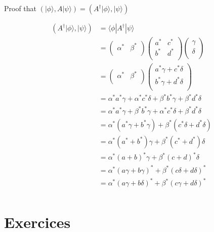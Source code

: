 \documentclass{article}
\begin{document}
Proof that $(|\phi\rangle, A|\psi\rangle) = (A^\dag|\phi\rangle, |\psi\rangle)$

\begin{equation}
    \begin{split}
        (A^\dag|\phi\rangle, |\psi\rangle) & = \langle\phi|A^\dag|\psi\rangle \\
        & = \begin{pmatrix}
            \alpha^* & \beta^* \\
        \end{pmatrix} \begin{pmatrix}
            a^* & c^* \\
            b^* & d^* \\
        \end{pmatrix} \begin{pmatrix}
            \gamma \\
            \delta \\
        \end{pmatrix} \\
        & = \begin{pmatrix}
            \alpha^* & \beta^* \\
        \end{pmatrix} \begin{pmatrix}
            a^*\gamma + c^*\delta \\
            b^*\gamma + d^*\delta \\
        \end{pmatrix} \\
        & = \alpha^*a^*\gamma + \alpha^*c^*\delta + \beta^*b^*\gamma + \beta^*d^*\delta \\
        & = \alpha^*a^*\gamma + \beta^*b^*\gamma + \alpha^*c^*\delta + \beta^*d^*\delta \\
        & = \alpha^*(a^*\gamma + b^*\gamma) + \beta^*(c^*\delta + d^*\delta) \\
        & = \alpha^*(a^* + b^*)\gamma + \beta^*(c^* + d^*)\delta \\
        & = \alpha^*(a + b)^*\gamma + \beta^*(c + d)^*\delta \\
        & = \alpha^*(a\gamma + b\gamma)^* + \beta^*(c\delta + d\delta)^* \\
        & = \alpha^*(a\gamma + b\delta)^* + \beta^*(c\gamma + d\delta)^* \\
    \end{split}
\end{equation}

\section{Exercices}
\end{document}
